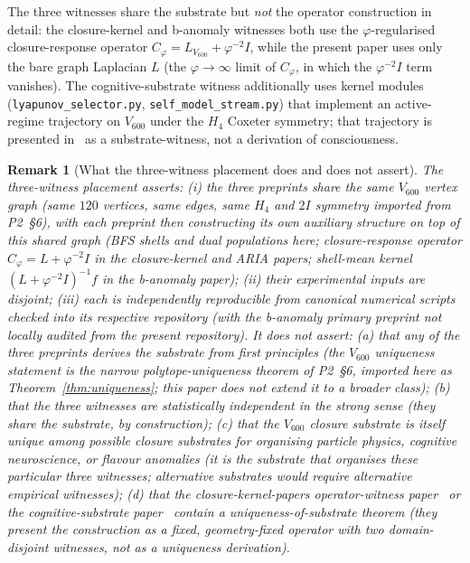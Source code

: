 \documentclass[12pt]{article}
\newtheorem{remark}[theorem]{Remark}
\begin{document}
The three witnesses share the substrate but \emph{not} the operator construction in detail: the closure-kernel and b-anomaly witnesses both use the $\varphi$-regularised closure-response operator $C_\varphi = L_{V_{600}} + \varphi^{-2} I$, while the present paper uses only the bare graph Laplacian $L$ (the $\varphi \to \infty$ limit of $C_\varphi$, in which the $\varphi^{-2} I$ term vanishes). The cognitive-substrate witness additionally uses kernel modules (\texttt{lyapunov\_selector.py}, \texttt{self\_model\_stream.py}) that implement an active-regime trajectory on $V_{600}$ under the $H_4$ Coxeter symmetry; that trajectory is presented in~\citep{SmartARIAChess2026} as a substrate-witness, not a derivation of consciousness.

\begin{remark}[What the three-witness placement does and does not assert]
The three-witness placement asserts: (i) the three preprints share the same $V_{600}$ \emph{vertex graph} (same $120$ vertices, same edges, same $H_4$ and $2I$ symmetry imported from P2~\S 6), with each preprint then constructing its own auxiliary structure on top of this shared graph (BFS shells and dual populations here; closure-response operator $C_\varphi = L + \varphi^{-2} I$ in the closure-kernel and ARIA papers; shell-mean kernel $(L + \varphi^{-2} I)^{-1} f$ in the b-anomaly paper); (ii) their experimental inputs are disjoint; (iii) each is independently reproducible from canonical numerical scripts checked into its respective repository (with the b-anomaly primary preprint not locally audited from the present repository). It does \emph{not} assert: (a) that any of the three preprints derives the substrate from first principles (the $V_{600}$ uniqueness statement is the narrow polytope-uniqueness theorem of P2~\S 6, imported here as Theorem~\ref{thm:uniqueness}; this paper does not extend it to a broader class); (b) that the three witnesses are statistically independent in the strong sense (they share the substrate, by construction); (c) that the $V_{600}$ closure substrate is itself unique among possible closure substrates for organising particle physics, cognitive neuroscience, or flavour anomalies (it is the substrate that organises these particular three witnesses; alternative substrates would require alternative empirical witnesses); (d) that the closure-kernel-papers operator-witness paper~\citep{SmartARIAClosureKernel2026} or the cognitive-substrate paper~\citep{SmartARIAChess2026} contain a uniqueness-of-substrate theorem (they present the construction as a fixed, geometry-fixed operator with two domain-disjoint witnesses, not as a uniqueness derivation).
\end{remark}
\end{document}
